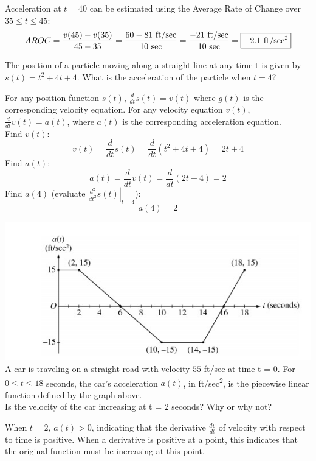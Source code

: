 \documentclass[12pt,letterpaper, onecolumn]{exam}
\newcommand\at[2]{\left.#1\right|_{#2}}
\begin{document}
\begin{questions}
\begin{solution}
	Acceleration at $t=40$ can be estimated using the Average Rate of Change over $35 \leq t \leq 45$:
	$$AROC=\frac{v(45)-v(35)}{45-35}=\frac{60-81 \text{ ft/sec}}{10 \text{ sec}}= \frac{-21\text{ ft/sec}}{10 \text{ sec}} = \boxed{-2.1 \text{ ft/sec\textsuperscript{2}}}$$
\end{solution}

\pagebreak

\question
The position of a particle moving along a straight line at any time t is given by $s(t)=t^2+4t+4$. What is the acceleration of the particle when $t=4$?

\begin{solution}
	For any position function $s(t)$, $\frac{d}{dt} s(t) = v(t)$ where $g(t)$ is the corresponding velocity equation. For any velocity equation $v(t)$, $\frac{d}{dt} v(t) = a(t)$, where $a(t)$ is the corresponding acceleration equation. \\
	Find $v(t)$:
	$$v(t)=\frac{d}{dt} s(t) =\frac{d}{dt} (t^2+4t+4) = 2t+4 $$
	Find $a(t)$:
	$$a(t)=\frac{d}{dt} v(t) =\frac{d}{dt} (2t+4) = 2 $$
	Find $a(4)$ (evaluate $\at{\frac{d^{2}}{dt^{2}}s(t)}{t=4}$):
	$$\boxed{a(4)=2}$$
\end{solution}


\pagebreak

\question
\includegraphics[width=0.7\linewidth]{Question10-001} \\
A car is traveling on a straight road with velocity $55$ ft/sec at time t = 0. For $0 \leq t \leq 18$ seconds, the car's acceleration $a(t)$, in ft/sec\textsuperscript{2}, is the piecewise linear function defined by the graph above. \\
Is the velocity of the car increasing at t = 2 seconds? Why or why not?
\begin{solution}
	When $t=2$, $a(t) > 0$, indicating that the derivative $\frac{dv}{dt}$ of velocity with respect to time is positive. When a derivative is positive at a point, this indicates that the original function must be increasing at this point. \\  
\end{solution}


\end{questions}
\end{document}
